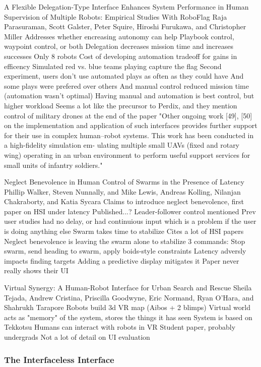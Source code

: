 A Flexible Delegation-Type Interface Enhances System Performance in Human Supervision of Multiple Robots: Empirical Studies With RoboFlag
Raja Parasuraman, Scott Galster, Peter Squire, Hiroshi Furukawa, and Christopher Miller
	Addresses whether encreasing autonomy can help
	Playbook control, waypoint control, or both
	Delegation decreases mission time and increases successes
	Only 8 robots
	Cost of developing automation tradeoff for gains in efficency
	Simulated red vs. blue teams playing capture the flag
	Second experiment, users don't use automated plays as often as they could have
		And some plays were prefered over others
		And manual control reduced mission time (automation wasn't optimal)
		Having manual and automation is best control, but higher workload
	Seems a lot like the precursor to Perdix, and they mention control of military drones at the end of the paper "Other ongoing work [49], [50] on
the implementation and application of such interfaces provides
further support for their use in complex human–robot systems.
This work has been conducted in a high-fidelity simulation em-
ulating multiple small UAVs (fixed and rotary wing) operating
in an urban environment to perform useful support services for
small units of infantry soldiers."

Neglect Benevolence in Human Control of Swarms in the Presence of Latency
Phillip Walker, Steven Nunnally, and Mike Lewis, Andreas Kolling, Nilanjan Chakraborty, and Katia Sycara 
	Claims to introduce neglect benevolence, first paper on HSI under latency
		Published...?
	Leader-follower control mentioned
	Prev user studies had no delay, or had continuious input
		which is a problem if the user is doing anything else
	Swarm takes time to stabilize
		Cites a lot of HSI papers
		Neglect benevolence is leaving the swarm alone to stabilize
	3 commands: Stop swarm, send heading to swarm, apply boids-style constraints
	Latency adversly impacts finding targets
	Adding a predictive display mitigates it
	Paper never really shows their UI

Virtual Synergy: A Human-Robot Interface for Urban Search and Rescue
Sheila Tejada, Andrew Cristina, Priscilla Goodwyne, Eric Normand, Ryan O’Hara, and Shahrukh Tarapore
	Robots build 3d VR map (Aibos + 2 blimps)
	Virtual world acts as "memory" of the system, stores the things it has seen
	System is based on Tekkotsu
	Humans can interact with robots in VR
	Student paper, probably undergrads
	Not a lot of detail on UI evaluation

\subsubsection{The Interfaceless Interface}	

